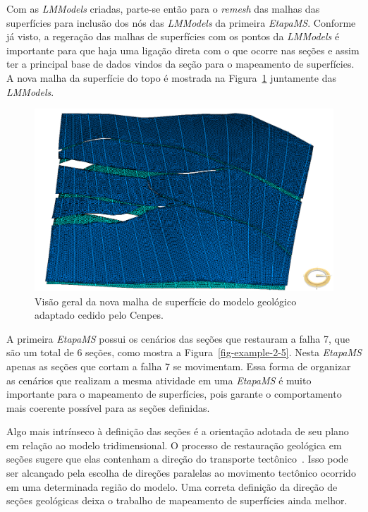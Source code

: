 Com as \textit{LMModels} criadas, parte-se então para o \textit{remesh} das malhas das superfícies para inclusão dos nós das \textit{LMModels} da primeira \textit{EtapaMS}. Conforme já visto, a regeração das malhas de superfícies com os pontos da \textit{LMModels} é importante para que haja uma ligação direta com o que ocorre nas seções e assim ter a principal base de dados vindos da seção para o mapeamento de superfícies. A nova malha da superfície do topo é mostrada na Figura~\ref{fig-example-2-4} juntamente das \textit{LMModels}.

\begin{figure} [h]
  \begin{center}
    \includegraphics[width=\textwidth]{images/fig-example-2-3}
    \caption{Visão geral da nova malha de superfície do modelo geológico adaptado cedido pelo Cenpes.}\label{fig-example-2-4}
  \end{center}
\end{figure}

A primeira \textit{EtapaMS} possui os cenários das seções que restauram a falha 7, que são um total de 6 seções, como mostra a Figura~\ref{fig-example-2-5}. Nesta \textit{EtapaMS} apenas as seções que cortam a falha 7 se movimentam. Essa forma de organizar as cenários que realizam a mesma atividade em uma \textit{EtapaMS} é muito importante para o mapeamento de superfícies, pois garante o comportamento mais coerente possível para as seções definidas.

Algo mais intrínseco à definição das seções é a orientação adotada de seu plano em relação ao modelo tridimensional. O processo de restauração geológica em seções sugere que elas contenham a direção do transporte tectônico~\cite{Fossen}. Isso pode ser alcançado pela escolha de direções paralelas ao movimento tectônico ocorrido em uma determinada região do modelo. Uma correta definição da direção de seções geológicas deixa o trabalho de mapeamento de superfícies ainda melhor.


